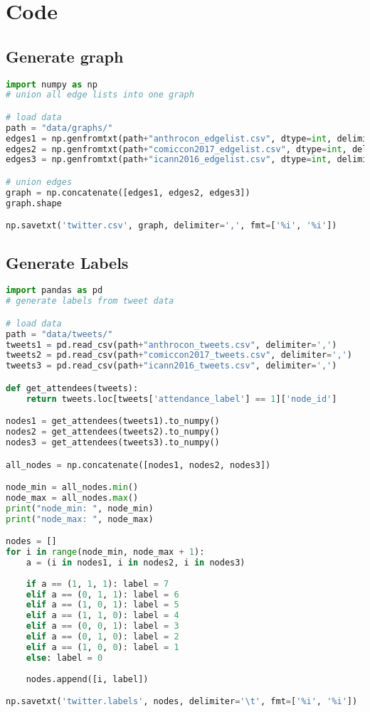 \documentclass[sigconf]{acmart}
\begin{document}
\appendix

\section{Code}

\subsection{Generate graph}

\begin{lstlisting}[language=python]
import numpy as np
# union all edge lists into one graph

# load data
path = "data/graphs/"
edges1 = np.genfromtxt(path+"anthrocon_edgelist.csv", dtype=int, delimiter=',')
edges2 = np.genfromtxt(path+"comiccon2017_edgelist.csv", dtype=int, delimiter=',')
edges3 = np.genfromtxt(path+"icann2016_edgelist.csv", dtype=int, delimiter=',')

# union edges
graph = np.concatenate([edges1, edges2, edges3])
graph.shape

np.savetxt('twitter.csv', graph, delimiter=',', fmt=['%i', '%i'])
\end{lstlisting}

\subsection{Generate Labels}

\begin{lstlisting}[language=python]
import pandas as pd
# generate labels from tweet data

# load data
path = "data/tweets/"
tweets1 = pd.read_csv(path+"anthrocon_tweets.csv", delimiter=',')
tweets2 = pd.read_csv(path+"comiccon2017_tweets.csv", delimiter=',')
tweets3 = pd.read_csv(path+"icann2016_tweets.csv", delimiter=',')

def get_attendees(tweets):
    return tweets.loc[tweets['attendance_label'] == 1]['node_id']

nodes1 = get_attendees(tweets1).to_numpy()
nodes2 = get_attendees(tweets2).to_numpy()
nodes3 = get_attendees(tweets3).to_numpy()

all_nodes = np.concatenate([nodes1, nodes2, nodes3])

node_min = all_nodes.min()
node_max = all_nodes.max()
print("node_min: ", node_min)
print("node_max: ", node_max)

nodes = []
for i in range(node_min, node_max + 1):
    a = (i in nodes1, i in nodes2, i in nodes3)
    
    if a == (1, 1, 1): label = 7
    elif a == (0, 1, 1): label = 6
    elif a == (1, 0, 1): label = 5
    elif a == (1, 1, 0): label = 4
    elif a == (0, 0, 1): label = 3
    elif a == (0, 1, 0): label = 2
    elif a == (1, 0, 0): label = 1
    else: label = 0
    
    nodes.append([i, label])

np.savetxt('twitter.labels', nodes, delimiter='\t', fmt=['%i', '%i'])
\end{lstlisting}
\end{document}
